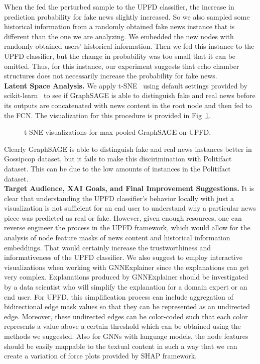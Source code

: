 When the fed the perturbed sample to the UPFD classifier, the increase in prediction probability for fake news slightly increased. So we also sampled some historical information from a randomly obtained fake news instance that is different than the one we are analyzing. We embedded the new nodes with randomly obtained users' historical information. Then we fed this instance to the UPFD classifier, but the change in probability was too small that it can be omitted. Thus, for this instance, our experiment suggests that echo chamber structures does not necessarily increase the probability for fake news.\\
\textbf{Latent Space Analysis.} We apply t-SNE~\parencite{tSNE_vanDerMaaten} using default settings provided by scikit-learn~\parencite{ScikitLearn_Pedregosa} to see if GraphSAGE is able to distinguish fake and real news before its outputs are concatenated with news content in the root node and then fed to the FCN. The visualization for this procedure is provided in Fig~\ref{fig:TSNE_GraphSAGE}.
\begin{figure}
    \centering
    \hfill
    \caption[t-SNE visualizations for GraphSAGE]{t-SNE visualizations for max pooled GraphSAGE on UPFD.}
    \label{fig:TSNE_GraphSAGE}
\end{figure}
Clearly GraphSAGE is able to distinguish fake and real news instances better in Gossipcop dataset, but it fails to make this discirimination with Politifact dataset. This can be due to the low amounts of instances in the Politifact dataset.\\
\textbf{Target Audience, XAI Goals, and Final Improvement Suggestions.} It is clear that understanding the UPFD classifier's behavior locally with just a visualization is not sufficient for an end user to understand why a particular news piece was predicted as real or fake. However, given enough resources, one can reverse engineer the process in the UPFD framework, which would allow for the analysis of node feature masks of news content and historical information embeddings. That would certainly increase the trustworthiness and informativeness of the UPFD classifier. We also suggest to employ interactive visualizations when working with GNNExplainer since the explanations can get very complex. Explanations produced by GNNExplainer should be investigated by a data scientist who will simplify the explanation for a domain expert or an end user. For UPFD, this simplification process can include aggregation of bidirectional edge mask values so that they can be represented as an undirected edge. Moreover, these undirected edges can be color-coded such that each color represents a value above a certain threshold which can be obtained using the methods we suggested. Also for GNNs with language models, the node features should be easily mappable to the textual content in such a way that we can create a variation of force plots provided by SHAP framework.\\
